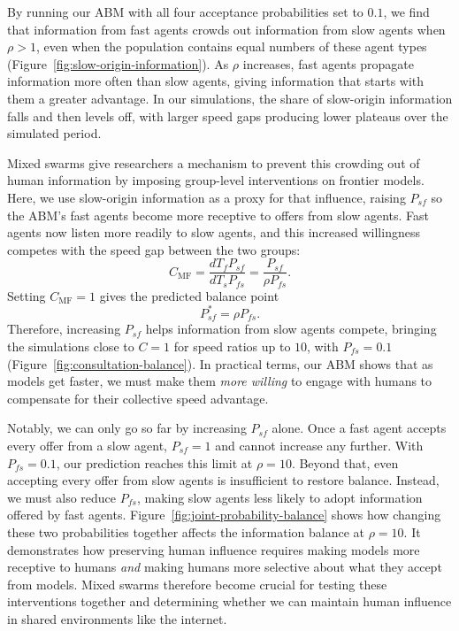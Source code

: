 

By running our ABM with all four acceptance probabilities set to $0.1$, we find that information from fast agents crowds out information from slow agents when $\rho>1$, even when the population contains equal numbers of these agent types (Figure~\ref{fig:slow-origin-information}). As $\rho$ increases, fast agents propagate information more often than slow agents, giving information that starts with them a greater advantage. In our simulations, the share of slow-origin information falls and then levels off, with larger speed gaps producing lower plateaus over the simulated period.



Mixed swarms give researchers a mechanism to prevent this crowding out of human information by imposing group-level interventions on frontier models. Here, we use slow-origin information as a proxy for that influence, raising $P_{sf}$ so the ABM's fast agents become more receptive to offers from slow agents. Fast agents now listen more readily to slow agents, and this increased willingness competes with the speed gap between the two groups:
\begin{equation}
    C_{\mathrm{MF}}=\frac{dT_f P_{sf}}{dT_s P_{fs}}
    =\frac{P_{sf}}{\rho P_{fs}}.
    \label{eq:mean-field-representation}
\end{equation}
Setting $C_{\mathrm{MF}}=1$ gives the predicted balance point
\begin{equation}
    P_{sf}^{*}=\rho P_{fs}.
    \label{eq:predicted-balance}
\end{equation}
Therefore, increasing $P_{sf}$ helps information from slow agents compete, bringing the simulations close to $C=1$ for speed ratios up to $10$, with $P_{fs}=0.1$ (Figure~\ref{fig:consultation-balance}). In practical terms, our ABM shows that as models get faster, we must make them \textit{more willing} to engage with humans to compensate for their collective speed advantage.



Notably, we can only go so far by increasing $P_{sf}$ alone. Once a fast agent accepts every offer from a slow agent, $P_{sf}=1$ and cannot increase any further. With $P_{fs}=0.1$, our prediction reaches this limit at $\rho=10$. Beyond that, even accepting every offer from slow agents is insufficient to restore balance. Instead, we must also reduce $P_{fs}$, making slow agents less likely to adopt information offered by fast agents. Figure~\ref{fig:joint-probability-balance} shows how changing these two probabilities together affects the information balance at $\rho=10$. It demonstrates how preserving human influence requires making models more receptive to humans \emph{and} making humans more selective about what they accept from models. Mixed swarms therefore become crucial for testing these interventions together and determining whether we can maintain human influence in shared environments like the internet. 

